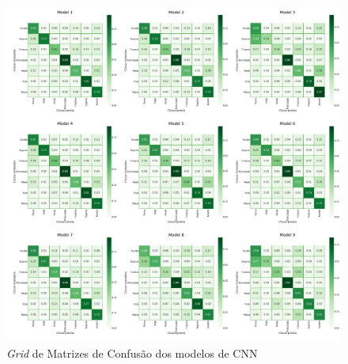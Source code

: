 \begin{figure}[!htb]
    \centering
    \includegraphics[width=17cm]{images/cm_grid.png}
    \caption{\emph{Grid} de Matrizes de Confusão dos modelos de CNN}
    \label{fig:grid}
\end{figure}
